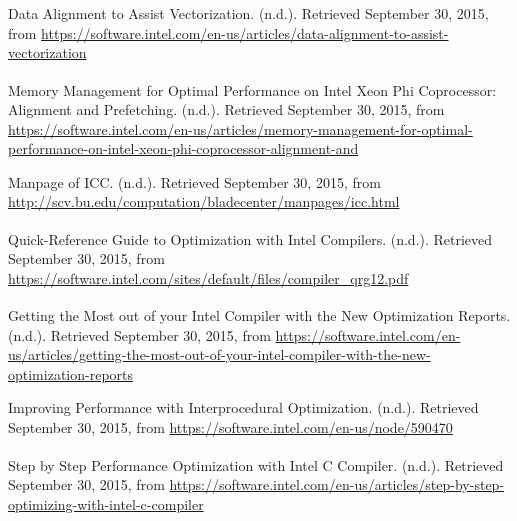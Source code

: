 \documentclass[11pt]{article}
\theoremstyle{plain}
\theoremstyle{definition}
\begin{document}
\begin{thebibliography}{9}
Data Alignment to Assist Vectorization. (n.d.). Retrieved September 30, 2015, from \url{https://software.intel.com/en-us/articles/data-alignment-to-assist-vectorization}
 
Memory Management for Optimal Performance on Intel\textsuperscript{\textregistered} Xeon Phi\textsuperscript{\texttrademark} Coprocessor: Alignment and Prefetching. (n.d.). Retrieved September 30, 2015, from \url{https://software.intel.com/en-us/articles/memory-management-for-optimal-performance-on-intel-xeon-phi-coprocessor-alignment-and}

Manpage of ICC. (n.d.). Retrieved September 30, 2015, from \url{http://scv.bu.edu/computation/bladecenter/manpages/icc.html}
 
Quick-Reference Guide to Optimization with Intel\textsuperscript{\textregistered} Compilers. (n.d.). Retrieved September 30, 2015, from \url{https://software.intel.com/sites/default/files/compiler_qrg12.pdf}

Getting the Most out of your Intel\textsuperscript{\textregistered} Compiler with the New Optimization Reports. (n.d.). Retrieved September 30, 2015, from \url{https://software.intel.com/en-us/articles/getting-the-most-out-of-your-intel-compiler-with-the-new-optimization-reports}

Improving Performance with Interprocedural Optimization. (n.d.). Retrieved September 30, 2015, from \url{https://software.intel.com/en-us/node/590470}

Step by Step Performance Optimization with Intel\textsuperscript{\textregistered} C Compiler. (n.d.). Retrieved September 30, 2015, from \url{https://software.intel.com/en-us/articles/step-by-step-optimizing-with-intel-c-compiler}



\end{thebibliography}

 
 
\end{document}
